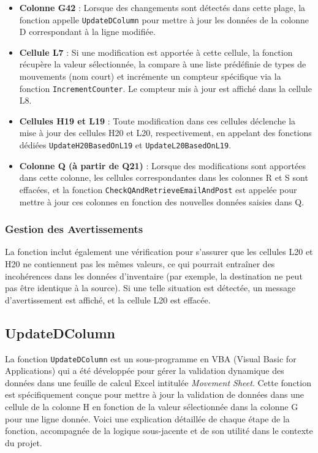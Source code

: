 \documentclass[a4paper, oneside, 12pt, final]{extreport}
\begin{document}
\begin{itemize}
    \item \textbf{Colonne G42} : Lorsque des changements sont détectés dans cette plage, la fonction appelle \texttt{UpdateDColumn} pour mettre à jour les données de la colonne D correspondant à la ligne modifiée.
    
    \item \textbf{Cellule L7} : Si une modification est apportée à cette cellule, la fonction récupère la valeur sélectionnée, la compare à une liste prédéfinie de types de mouvements (nom court) et incrémente un compteur spécifique via la fonction \texttt{IncrementCounter}. Le compteur mis à jour est affiché dans la cellule L8.
    
    \item \textbf{Cellules H19 et L19} : Toute modification dans ces cellules déclenche la mise à jour des cellules H20 et L20, respectivement, en appelant des fonctions dédiées \texttt{UpdateH20BasedOnL19} et \texttt{UpdateL20BasedOnL19}.
    
    \item \textbf{Colonne Q (à partir de Q21)} : Lorsque des modifications sont apportées dans cette colonne, les cellules correspondantes dans les colonnes R et S sont effacées, et la fonction \texttt{CheckQAndRetrieveEmailAndPost} est appelée pour mettre à jour ces colonnes en fonction des nouvelles données saisies dans Q.
\end{itemize}

\subsubsection{Gestion des Avertissements}
La fonction inclut également une vérification pour s'assurer que les cellules L20 et H20 ne contiennent pas les mêmes valeurs, ce qui pourrait entraîner des incohérences dans les données d'inventaire (par exemple, la destination ne peut pas être identique à la source). Si une telle situation est détectée, un message d'avertissement est affiché, et la cellule L20 est effacée.


\subsection{UpdateDColumn}
La fonction \texttt{UpdateDColumn} est un sous-programme en VBA (Visual Basic for Applications) qui a été développée pour gérer la validation dynamique des données dans une feuille de calcul Excel intitulée \textit{Movement Sheet}. Cette fonction est spécifiquement conçue pour mettre à jour la validation de données dans une cellule de la colonne H en fonction de la valeur sélectionnée dans la colonne G pour une ligne donnée. Voici une explication détaillée de chaque étape de la fonction, accompagnée de la logique sous-jacente et de son utilité dans le contexte du projet.
\end{document}
